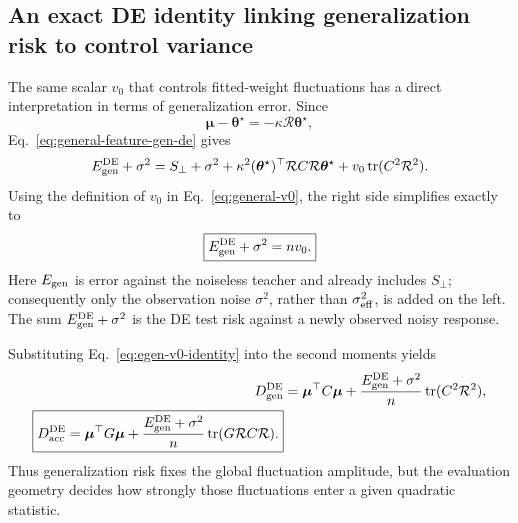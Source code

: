 \documentclass[11pt]{article}
\newcommand{\tr}{\operatorname{tr}}
\newcommand{\tstar}{\bm\theta^{\star}}
\begin{document}
\subsection{An exact DE identity linking generalization risk to control
variance}

The same scalar $v_0$ that controls fitted-weight fluctuations has a direct
interpretation in terms of generalization error.  Since
\begin{equation}
  \bm\mu-\tstar=-\kappa\mathcal R\tstar,
\end{equation}
Eq.~\eqref{eq:general-feature-gen-de} gives
\begin{equation}
  E_{\rm gen}^{\rm DE}+\sigma^2
  =S_{\perp}+\sigma^2
   +\kappa^2(\tstar)^{\top}\mathcal R C\mathcal R\tstar
   +v_0\tr(C^2\mathcal R^2).
\end{equation}
Using the definition of $v_0$ in Eq.~\eqref{eq:general-v0}, the right side
simplifies exactly to
\begin{equation}
  \boxed{E_{\rm gen}^{\rm DE}+\sigma^2=n v_0.}
  \label{eq:egen-v0-identity}
\end{equation}
Here $E_{\rm gen}$ is error against the noiseless teacher and already includes
$S_{\perp}$; consequently only the observation noise $\sigma^2$, rather than
$\sigma_{\rm eff}^2$, is added on the left.  The sum
$E_{\rm gen}^{\rm DE}+\sigma^2$ is the DE test risk against a newly observed
noisy response.

Substituting Eq.~\eqref{eq:egen-v0-identity} into the second moments yields
\begin{align}
  D_{\rm gen}^{\rm DE}
    &=\bm\mu^{\top}C\bm\mu
      +\frac{E_{\rm gen}^{\rm DE}+\sigma^2}{n}
       \tr(C^2\mathcal R^2),\\
  \boxed{
  D_{\rm acc}^{\rm DE}
    =\bm\mu^{\top}G\bm\mu
      +\frac{E_{\rm gen}^{\rm DE}+\sigma^2}{n}
       \tr(G\mathcal R C\mathcal R).}
  \label{eq:dacc-egen-identity}
\end{align}
Thus generalization risk fixes the global fluctuation amplitude, but the
evaluation geometry decides how strongly those fluctuations enter a given
quadratic statistic.
\end{document}
